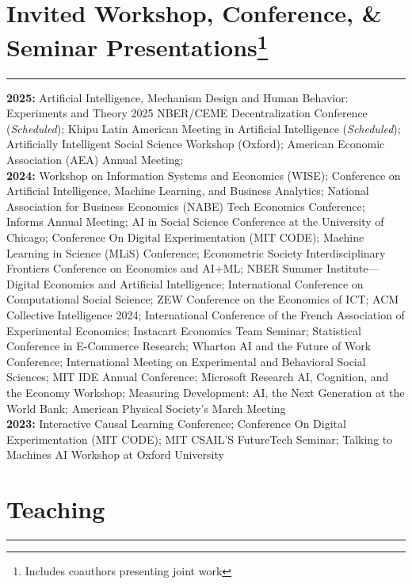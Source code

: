 \documentclass[11.25pt]{article}
\begin{document}
\vspace{-.45cm}

\section*{Invited Workshop, Conference, \& Seminar Presentations\footnote{Includes coauthors presenting joint work}}  \vspace{-1mm} \hrule
\vspace{3mm}
\textbf{2025:} 
Artificial Intelligence, Mechanism Design and Human Behavior: Experiments and Theory 2025 NBER/CEME Decentralization Conference (\textit{Scheduled});
Khipu Latin American Meeting in Artificial Intelligence (\textit{Scheduled});
Artificially Intelligent Social Science Workshop (Oxford);
American Economic Association (AEA) Annual Meeting;\vspace{3mm}\\
\textbf{2024:} Workshop on Information Systems and Economics (WISE);
Conference on Artificial Intelligence, Machine Learning, and Business Analytics;
National Association for Business Economics (NABE) Tech Economics Conference; 
Informs Annual Meeting;
AI in Social Science Conference at the University of Chicago;
Conference On Digital Experimentation (MIT CODE);
Machine Learning in Science (MLiS) Conference;
Econometric Society Interdisciplinary Frontiers Conference on Economics and AI+ML; 
NBER Summer Institute---Digital Economics and Artificial Intelligence;
International Conference on Computational Social Science;
ZEW Conference on the Economics of ICT;
ACM Collective Intelligence 2024;
International Conference of the French Association of Experimental Economics;
Instacart Economics Team Seminar;
Statistical Conference in E-Commerce Research;
Wharton AI and the Future of Work Conference; 
International Meeting on Experimental and Behavioral Social Sciences;
MIT IDE Annual Conference; 
Microsoft Research AI, Cognition, and the Economy Workshop; 
Measuring Development: AI, the Next Generation at the World Bank; 
American Physical Society's March Meeting\vspace{3mm}\\
\textbf{2023:} Interactive Causal Learning Conference; 
Conference On Digital Experimentation (MIT CODE); 
MIT CSAIL'S FutureTech Seminar;
Talking to Machines AI Workshop at Oxford University
\\

\vspace{-.45cm}

\section*{Teaching}  \vspace{-1mm} \hrule
\vspace{3mm}
\end{document}
